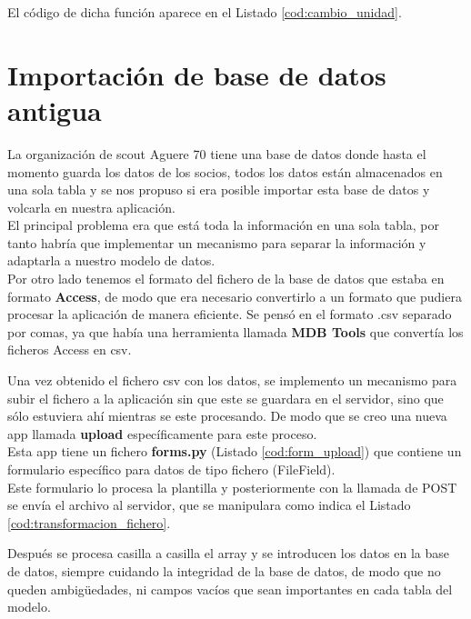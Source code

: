 El código de dicha función aparece en el Listado \ref{cod:cambio_unidad}.\\



\section{Importación de base de datos antigua}
\label{4:sec11}

La organización de scout Aguere 70 tiene una base de datos donde hasta el momento guarda los datos de los socios, todos los datos están almacenados en una sola tabla y se nos propuso si era posible importar esta base de datos
y volcarla en nuestra aplicación.\\

El principal problema era que está toda la información en una sola tabla, por tanto habría que implementar un mecanismo para separar la información y adaptarla a nuestro modelo de datos.\\

Por otro lado tenemos el formato del fichero de la base de datos que estaba en formato \textbf{Access}, de modo que era necesario convertirlo a un formato que pudiera procesar la aplicación de manera eficiente. Se pensó 
en el formato .csv separado por comas, ya que había una herramienta llamada \textbf{MDB Tools} que convertía los ficheros Access en csv.

Una vez obtenido el fichero csv con los datos, se implemento un mecanismo para subir el fichero a la aplicación sin que este se guardara en el servidor, sino que sólo estuviera ahí mientras se este procesando. De modo que se creo 
una nueva app llamada \textbf{upload} específicamente para este proceso.\\

Esta app tiene un fichero \textbf{forms.py} (Listado \ref{cod:form_upload}) que contiene un formulario específico para datos de tipo fichero (FileField).\\


\bigskip
Este formulario lo procesa la plantilla y posteriormente con la llamada de POST se envía el archivo al servidor, que se manipulara como indica el Listado \ref{cod:transformacion_fichero}.
\bigskip

\bigskip
Después se procesa casilla a casilla el array y se introducen los datos en la base de datos, siempre cuidando la integridad de la base de datos, de modo que no queden ambigüedades, ni campos vacíos que sean importantes 
en cada tabla del modelo.\\

